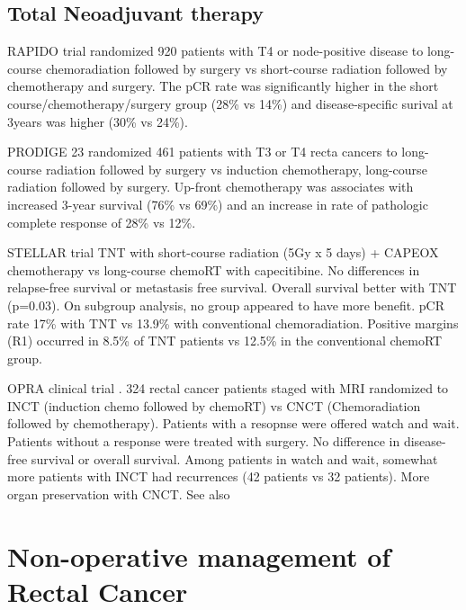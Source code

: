 \documentclass[
]{book}
\begin{document}
\hypertarget{total-neoadjuvant-therapy}{%
\subsection{Total Neoadjuvant therapy}\label{total-neoadjuvant-therapy}}

RAPIDO trial randomized 920 patients with T4 or node-positive disease to long-course chemoradiation followed by surgery vs short-course radiation followed by chemotherapy and surgery. The pCR rate was significantly higher in the short course/chemotherapy/surgery group (28\% vs 14\%) and disease-specific surival at 3years was higher (30\% vs 24\%).\citep{bahadoer29} \citep{vandervalk75}

PRODIGE 23 randomized 461 patients with T3 or T4 recta cancers to long-course radiation followed by surgery vs induction chemotherapy, long-course radiation followed by surgery. Up-front chemotherapy was associates with increased 3-year survival (76\% vs 69\%) and an increase in rate of pathologic complete response of 28\% vs 12\%.\citep{conroy702}

STELLAR trial \citep{jin1681} TNT with short-course radiation (5Gy x 5 days) + CAPEOX chemotherapy vs long-course chemoRT with capecitibine. No differences in relapse-free survival or metastasis free survival. Overall survival better with TNT (p=0.03). On subgroup analysis, no group appeared to have more benefit. pCR rate 17\% with TNT vs 13.9\% with conventional chemoradiation. Positive margins (R1) occurred in 8.5\% of TNT patients vs 12.5\% in the conventional chemoRT group.

OPRA clinical trial \citep{garcia-aguilarJCO2200032}. 324 rectal cancer patients staged with MRI randomized to INCT (induction chemo followed by chemoRT) vs CNCT (Chemoradiation followed by chemotherapy). Patients with a resopnse were offered watch and wait. Patients without a response were treated with surgery. No difference in disease-free survival or overall survival. Among patients in watch and wait, somewhat more patients with INCT had recurrences (42 patients vs 32 patients). More organ preservation with CNCT. See also \citep{smith767}

\hypertarget{non-operative-management-of-rectal-cancer}{%
\section{Non-operative management of Rectal Cancer}\label{non-operative-management-of-rectal-cancer}}
\end{document}
